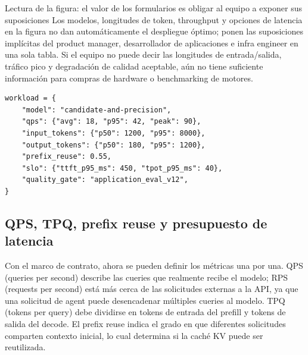 
\begin{knowledgebox}{Lectura de la figura: el valor de los formularios es obligar al equipo a exponer sus suposiciones}
Los modelos, longitudes de token, throughput y opciones de latencia en la figura no dan automáticamente el despliegue óptimo; ponen las suposiciones implícitas del product manager, desarrollador de aplicaciones e infra engineer en una sola tabla. Si el equipo no puede decir las longitudes de entrada/salida, tráfico pico y degradación de calidad aceptable, aún no tiene suficiente información para compras de hardware o benchmarking de motores.
\end{knowledgebox}

\begin{lstlisting}[caption={Estructura máquina-legible mínima para la definición de workload}]
workload = {
    "model": "candidate-and-precision",
    "qps": {"avg": 18, "p95": 42, "peak": 90},
    "input_tokens": {"p50": 1200, "p95": 8000},
    "output_tokens": {"p50": 180, "p95": 1200},
    "prefix_reuse": 0.55,
    "slo": {"ttft_p95_ms": 450, "tpot_p95_ms": 40},
    "quality_gate": "application_eval_v12",
}
\end{lstlisting}

\subsection{QPS, TPQ, prefix reuse y presupuesto de latencia}

Con el marco de contrato, ahora se pueden definir los métricas una por una. QPS (queries per second) describe las cueries que realmente recibe el modelo; RPS (requests per second) está más cerca de las solicitudes externas a la API, ya que una solicitud de agent puede desencadenar múltiples cueries al modelo. TPQ (tokens per query) debe dividirse en tokens de entrada del prefill y tokens de salida del decode. El prefix reuse indica el grado en que diferentes solicitudes comparten contexto inicial, lo cual determina si la caché KV puede ser reutilizada.


